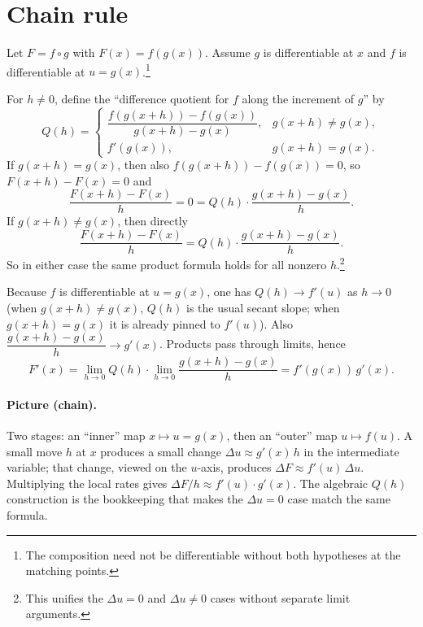 \documentclass[11pt]{article}
\begin{document}
\section*{Chain rule}
Let \(F=f\circ g\) with \(F(x)=f(g(x))\). Assume \(g\) is differentiable at \(x\) and
\(f\) is differentiable at \(u=g(x)\).\footnote{The composition need not be differentiable
without both hypotheses at the matching points.}

For \(h\neq 0\), define the ``difference quotient for \(f\) along the increment of
\(g\)'' by
\[
Q(h)=
\begin{cases}
\dfrac{f(g(x+h))-f(g(x))}{g(x+h)-g(x)}, & g(x+h)\neq g(x),\\[6pt]
f'(g(x)), & g(x+h)=g(x).
\end{cases}
\]
If \(g(x+h)=g(x)\), then also \(f(g(x+h))-f(g(x))=0\), so \(F(x+h)-F(x)=0\) and
\[
\frac{F(x+h)-F(x)}{h}=0=Q(h)\cdot\frac{g(x+h)-g(x)}{h}.
\]
If \(g(x+h)\neq g(x)\), then directly
\[
\frac{F(x+h)-F(x)}{h}
=Q(h)\cdot\frac{g(x+h)-g(x)}{h}.
\]
So in either case the same product formula holds for all nonzero \(h\).\footnote{This
unifies the \(\Delta u=0\) and \(\Delta u\neq 0\) cases without separate limit arguments.}

Because \(f\) is differentiable at \(u=g(x)\), one has \(Q(h)\to f'(u)\) as \(h\to 0\)
(when \(g(x+h)\neq g(x)\), \(Q(h)\) is the usual secant slope; when \(g(x+h)=g(x)\) it is
already pinned to \(f'(u)\)). Also \(\dfrac{g(x+h)-g(x)}{h}\to g'(x)\). Products pass
through limits, hence
\[
F'(x)=\lim_{h\to 0}Q(h)\cdot\lim_{h\to 0}\frac{g(x+h)-g(x)}{h}=f'(g(x))\,g'(x).
\]

\paragraph{Picture (chain).}
Two stages: an ``inner'' map \(x\mapsto u=g(x)\), then an ``outer'' map
\(u\mapsto f(u)\). A small move \(h\) at \(x\) produces a small change
\(\Delta u\approx g'(x)\,h\) in the intermediate variable; that change, viewed on
the \(u\)-axis, produces \(\Delta F\approx f'(u)\,\Delta u\). Multiplying the
local rates gives \(\Delta F/h\approx f'(u)\cdot g'(x)\). The algebraic \(Q(h)\)
construction is the bookkeeping that makes the \(\Delta u=0\) case match the
same formula.
\end{document}
